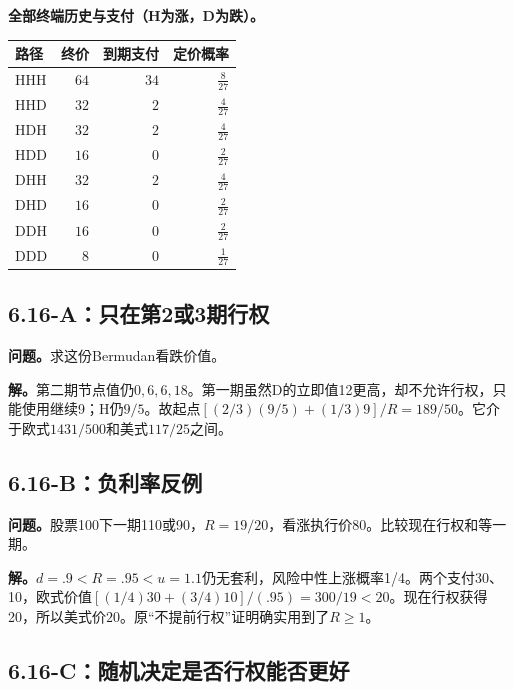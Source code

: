 \documentclass[11pt,a4paper,UTF8,fontset=fandol]{ctexart}
\begin{document}
\textbf{全部终端历史与支付（H为涨，D为跌）。}

\begin{longtable}[]{@{}lrrr@{}}
\toprule\noalign{}
路径 & 终价 & 到期支付 & 定价概率 \\
\midrule\noalign{}
\endhead
\bottomrule\noalign{}
\endlastfoot
HHH & \(64\) & \(34\) & \(\frac{8}{27}\) \\
HHD & \(32\) & \(2\) & \(\frac{4}{27}\) \\
HDH & \(32\) & \(2\) & \(\frac{4}{27}\) \\
HDD & \(16\) & \(0\) & \(\frac{2}{27}\) \\
DHH & \(32\) & \(2\) & \(\frac{4}{27}\) \\
DHD & \(16\) & \(0\) & \(\frac{2}{27}\) \\
DDH & \(16\) & \(0\) & \(\frac{2}{27}\) \\
DDD & \(8\) & \(0\) & \(\frac{1}{27}\) \\
\end{longtable}

\endgroup

\subsection{6.16-A：只在第2或3期行权}\label{aux53eaux5728ux7b2c2ux62163ux671fux884cux6743}

\textbf{问题。}求这份Bermudan看跌价值。

\textbf{解。}第二期节点值仍\(0,6,6,18\)。第一期虽然D的立即值12更高，却不允许行权，只能使用继续9；H仍\(9/5\)。故起点\([(2/3)(9/5)+(1/3)9]/R=\boxed{189/50}\)。它介于欧式\(1431/500\)和美式\(117/25\)之间。

\subsection{6.16-B：负利率反例}\label{bux8d1fux5229ux7387ux53cdux4f8b}

\textbf{问题。}股票100下一期110或90，\(R=19/20\)，看涨执行价80。比较现在行权和等一期。

\textbf{解。}\(d=.9<R=.95<u=1.1\)仍无套利，风险中性上涨概率1/4。两个支付30、10，欧式价值\([(1/4)30+(3/4)10]/(.95)=300/19<20\)。现在行权获得20，所以美式价\(\boxed{20}\)。原``不提前行权''证明确实用到了\(R\ge1\)。

\subsection{6.16-C：随机决定是否行权能否更好}\label{cux968fux673aux51b3ux5b9aux662fux5426ux884cux6743ux80fdux5426ux66f4ux597d}
\end{document}
